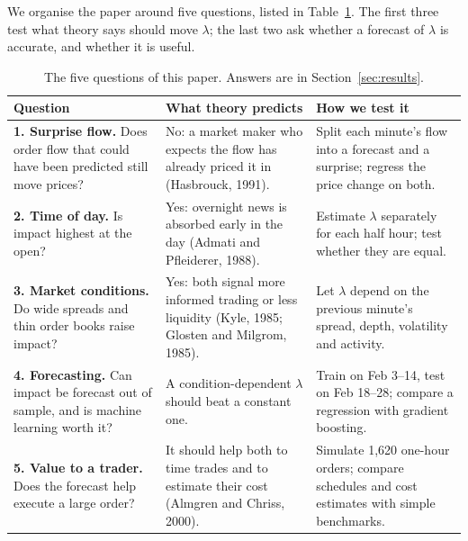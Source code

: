 \documentclass[10pt,letterpaper]{article}
\begin{document}
We organise the paper around five questions, listed in Table~\ref{tab:questions}. The first three test what theory says should move $\lambda$; the last two ask whether a forecast of $\lambda$ is accurate, and whether it is useful.

\begin{table}[h]
\centering\small
\caption{The five questions of this paper. Answers are in Section~\ref{sec:results}.}\label{tab:questions}
\begin{tabularx}{\textwidth}{@{}p{4.4cm}XX@{}}
\toprule
Question & What theory predicts & How we test it \\
\midrule
\textbf{1. Surprise flow.} Does order flow that could have been predicted still move prices? & No: a market maker who expects the flow has already priced it in (Hasbrouck, 1991). & Split each minute's flow into a forecast and a surprise; regress the price change on both. \\
\textbf{2. Time of day.} Is impact highest at the open? & Yes: overnight news is absorbed early in the day (Admati and Pfleiderer, 1988). & Estimate $\lambda$ separately for each half hour; test whether they are equal. \\
\textbf{3. Market conditions.} Do wide spreads and thin order books raise impact? & Yes: both signal more informed trading or less liquidity (Kyle, 1985; Glosten and Milgrom, 1985). & Let $\lambda$ depend on the previous minute's spread, depth, volatility and activity. \\
\textbf{4. Forecasting.} Can impact be forecast out of sample, and is machine learning worth it? & A condition-dependent $\lambda$ should beat a constant one. & Train on Feb 3--14, test on Feb 18--28; compare a regression with gradient boosting. \\
\textbf{5. Value to a trader.} Does the forecast help execute a large order? & It should help both to time trades and to estimate their cost (Almgren and Chriss, 2000). & Simulate 1,620 one-hour orders; compare schedules and cost estimates with simple benchmarks. \\
\bottomrule
\end{tabularx}
\end{table}
\end{document}
